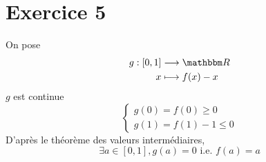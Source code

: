 \part{Exercice 5}

On pose \begin{align*}
	g: [0,1] &\longrightarrow \R \\
	x &\longmapsto f(x) - x
\end{align*}
$g$ est continue\\
\[
	\begin{cases}
		g(0) = f(0) \ge 0\\
		g(1) = f(1) - 1 \le 0
	\end{cases}
\] D'après le théorème des valeurs intermédiaires, \[
	\exists a \in [0,1], g(a) = 0 \text{ i.e. } f(a) = a
\]
